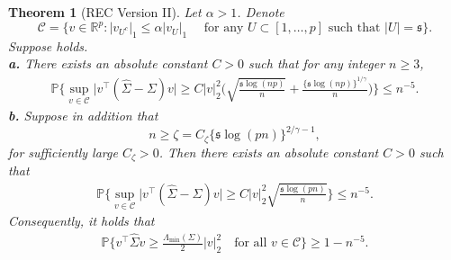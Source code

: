 \documentclass[11pt]{article}
\newcommand{\s}{ { \mathfrak{s}  } }
\newcommand{\p}{\mathbb P}
\theoremstyle{plain}
\newtheorem{theorem}{Theorem}
\theoremstyle{definition}
\begin{document}
 
 \begin{theorem}[REC Version II] \label{theorem:RES Version II} 
Let $\alpha >1$. 
Denote 
$$ \mathcal C = \{ v \in \mathbb R^p :  | v_{U^c}   |_1 \le  \alpha    | v_{U  } |_1 \quad \text{ for any }  U\subset [1,\ldots,p] \text{ such that } |U|  =  \s   \} . $$
Suppose     holds.
\
\\
{\bf a.}
There exists an absolute constant $C > 0$ such that for any integer $n\ge 3$, 
\begin{align*}
 \p\bigg\{  \sup_{ v\in \mathcal C } \bigg| v^\top  (\widehat \Sigma -\Sigma )v\bigg|        \ge   C |v|_2^2  \bigg( \sqrt { \frac{\s\log(np)}{ n}}  + \frac{\{ \s \log(np) \} ^{1/\gamma }}{n } \bigg)  \bigg\}    \le n^{-5}.
\end{align*}  
{\bf b.} Suppose in addition that 
$$ n \ge \zeta = C_\zeta\{ \s \log(pn)\}^{2/ \gamma  - 1},   $$ for sufficiently large $C_\zeta > 0$. Then 
there exists an absolute constant $C > 0$ such that 
\begin{align*}
 \p\bigg\{  \sup_{ v\in \mathcal C } \bigg| v^\top  (\widehat \Sigma -\Sigma )v\bigg|        \ge  C |v|_2^2 \sqrt { \frac{\s\log(pn)}{ n}}    \bigg\}    \le n^{-5}.
\end{align*} 
Consequently,
it holds that 
  \begin{align} \label{eq:RES lower bound}
 \p\bigg\{     v^\top  \widehat \Sigma   v     \ge   \frac{ \Lambda_{\min }(\Sigma) }{2}| v|_2^2 \quad \text{for all }  v\in \mathcal C   \bigg\}    \ge 1- n^{-5}.
 \end{align}  
\end{theorem} 
\end{document}

